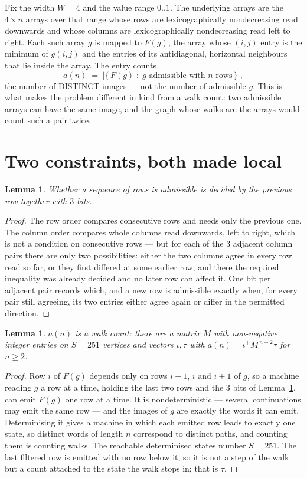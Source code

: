 \documentclass[11pt,a4paper]{article}
\theoremstyle{plain}
\newtheorem{lemma}[theorem]{Lemma}
\theoremstyle{definition}
\begin{document}
Fix the width $W=4$ and the value range $0..1$. The underlying arrays are the
$4\times n$ arrays over that range whose rows are lexicographically nondecreasing read downwards
and whose columns are lexicographically nondecreasing read left to right. Each such array $g$
is mapped to $F(g)$, the array whose $(i,j)$ entry is the minimum of $g(i,j)$ and the entries
of its antidiagonal, horizontal neighbours that lie inside the array. The entry counts
\[
a(n)\;=\;\bigl|\{\,F(g)\;:\;g\text{ admissible with }n\text{ rows}\,\}\bigr|,
\]
the number of DISTINCT images --- not the number of admissible $g$. This is what makes the
problem different in kind from a walk count: two admissible arrays can have the same image, and
the graph whose walks are the arrays would count such a pair twice.

\section{Two constraints, both made local}

\begin{lemma}\label{lem:local}
Whether a sequence of rows is admissible is decided by the previous row together with
$3$ bits.
\end{lemma}

\begin{proof}
The row order compares consecutive rows and needs only the previous one. The column order
compares whole columns read downwards, left to right, which is not a condition on consecutive
rows --- but for each of the $3$ adjacent column pairs there are only two possibilities:
either the two columns agree in every row read so far, or they first differed at some earlier
row, and there the required inequality was already decided and no later row can affect it. One
bit per adjacent pair records which, and a new row is admissible exactly when, for every pair
still agreeing, its two entries either agree again or differ in the permitted direction.
\end{proof}

\begin{lemma}\label{lem:det}
$a(n)$ is a walk count: there are a matrix $M$ with non-negative integer entries on $S=251$
vertices and vectors $\iota,\tau$ with $a(n)=\iota^{\!\top}M^{\,n-2}\tau$ for $n\ge2$.
\end{lemma}

\begin{proof}
Row $i$ of $F(g)$ depends only on rows $i-1$, $i$ and $i+1$ of $g$, so a machine reading $g$ a
row at a time, holding the last two rows and the $3$ bits of Lemma~\ref{lem:local}, can
emit $F(g)$ one row at a time. It is nondeterministic --- several continuations may emit the
same row --- and the images of $g$ are exactly the words it can emit. Determinising it gives a
machine in which each emitted row leads to exactly one state, so distinct words of length $n$
correspond to distinct paths, and counting them is counting walks. The reachable determinised
states number $S=251$. The last filtered row is emitted with no row below it, so it is not a
step of the walk but a count attached to the state the walk stops in; that is $\tau$.
\end{proof}
\end{document}
